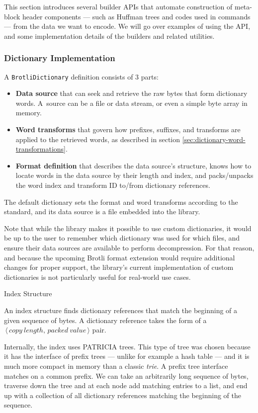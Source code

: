 \documentclass[english,master,dept460,male,cpp,cpdeclaration]{diploma}
\makeatletter
\renewcommand\paragraph
	{\@startsection{paragraph}{4}{\z@}
	{-3.25ex plus 1ex minus .2ex}
	{1.5ex plus .2ex}
	{\normalfont\normalsize\bfseries}}
\newcommand{\subfoursection}[1]{\paragraph{#1}}
\newcommand{\nosep}{\itemsep0em}
\newcommand{\pair}[2]{$\,\langle\,#1,\,#2\,\rangle$}
\makeatother
\begin{document}
	This section introduces several builder APIs that automate construction of meta-block header components --- such as Huffman trees and codes used in commands --- from the data we want to encode. We will go over examples of using the API, and some implementation details of the builders and related utilities.
	
		\subsubsection{Dictionary Implementation}
		
		A \verb|BrotliDictionary| definition consists of 3 parts:
		
		\begin{itemize} \nosep
			\item \textbf{Data source} that can seek and retrieve the raw bytes that form dictionary words. A~source can be a file or data stream, or even a simple byte array in memory.
			\item \textbf{Word transforms} that govern how prefixes, suffixes, and transforms are applied to the retrieved words, as described in section \ref{sec:dictionary-word-transformations}.
			\item \textbf{Format definition} that describes the data source's structure, knows how to locate words in the data source by their length and index, and packs/unpacks the word index and transform ID to/from dictionary references.
		\end{itemize}
		
		\noindent
		The default dictionary sets the format and word transforms according to the standard, and its data source is a file embedded into the library.
		
		Note that while the library makes it possible to use custom dictionaries, it would be up to the user to remember which dictionary was used for which files, and ensure their data sources are available to perform decompression. For that reason, and because the upcoming Brotli format extension would require additional changes for proper support, the library's current implementation of custom dictionaries is not particularly useful for real-world use cases.
		
			\subfoursection{Index Structure}
			
			An index structure finds dictionary references that match the beginning of a given sequence of bytes. A dictionary reference takes the form of a \pair{copy\ length}{packed\ value} pair.
			
			Internally, the index uses PATRICIA trees. This type of tree was chosen because it has the interface of prefix trees --- unlike for example a hash table --- and it is much more compact in memory than a classic \emph{trie}. A prefix tree interface matches on a common prefix. We can take an arbitrarily long sequence of bytes, traverse down the tree and at each node add matching entries to a list, and end up with a collection of all dictionary references matching the beginning of the sequence.
			
\end{document}
